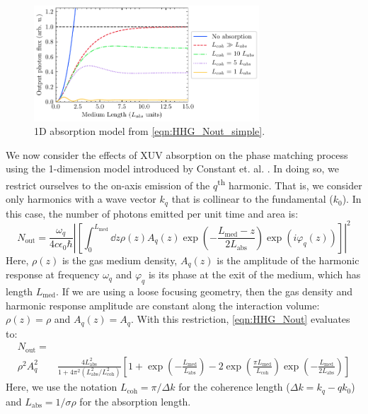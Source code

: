 \begin{figure}
	\centering
	\includegraphics[width=0.75\textwidth]{figures/chap1/Constant1999_fig1.pdf}
	\caption{1D absorption model from \cref{eqn:HHG_Nout_simple}.}
	\label{fig:Constant1999_fig1}
\end{figure}

We now consider the effects of XUV absorption on the phase matching process using the 1-dimension model introduced by Constant et. al. \cite{constantOptimizingHighHarmonic1999}. In doing so, we restrict ourselves to the on-axis emission of the $q$\textsuperscript{th} harmonic. That is, we consider only harmonics with a wave vector $k_q$ that is collinear to the fundamental ($k_0$). In this case, the number of photons emitted per unit time and area is:
\begin{equation}
N_{\textrm{out}} = \frac{\omega_q}{4 c \epsilon_0 \hbar} \left| \left[ \int_{0}^{L_{\textrm{med}}} \dd{z} \rho(z) A_q(z) \exp \left( - \frac{L_{\textrm{med}} - z}{2 L_{\textrm{abs}}}  \right) \exp \left( i \varphi_q(z) \right)  \right] \right|^2
\label{eqn:HHG_Nout}
\end{equation}
Here, $\rho(z)$ is the gas medium density, $A_q(z)$ is the amplitude of the harmonic response at frequency $\omega_q$ and $\varphi_q$ is its phase at the exit of the medium, which has length $L_{\textrm{med}}$. If we are using a loose focusing geometry, then the gas density and harmonic response amplitude are constant along the interaction volume: $\rho(z) = \rho$ and $A_q(z)=A_q$. With this restriction, \cref{eqn:HHG_Nout} evaluates to:
\begin{equation}
\begin{aligned}
N_{\textrm{out}} = & \\ \rho^2 A_q^2 & \frac{4L_{\textrm{abs}}^2}{1+4\pi^2(L_{\textrm{abs}}^2 / L_{\textrm{coh}}^2)} \left[ 1 + \exp\left(-\frac{L_{\textrm{med}}}{L_{\textrm{abs}}}\right) - 2 \exp\left(\frac{\pi L_{\textrm{med}}}{L_{\textrm{coh}}}\right) \exp\left(-\frac{L_{\textrm{med}}}{2L_{\textrm{abs}}}\right) \right]
\label{eqn:HHG_Nout_simple}
\end{aligned}
\end{equation}
Here, we use the notation $L_{\textrm{coh}} = \pi/\Delta k$ for the coherence length ($\Delta k = k_q - q k_0$) and $L_{\textrm{abs}} = 1/{\sigma \rho}$ for the absorption length.

